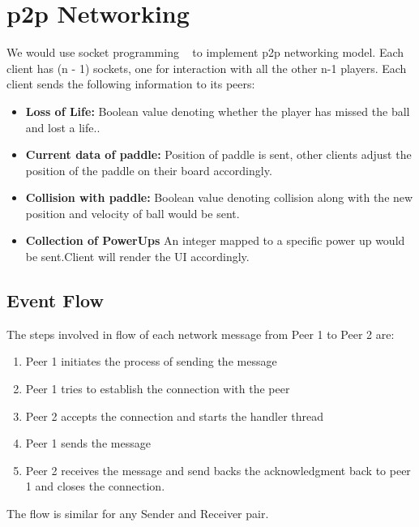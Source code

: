 \documentclass{article}
\begin{document}
			\section{p2p Networking}
			\par\noindent We would use socket programming ~\cite{socket_java} to implement p2p networking model. Each client has (n - 1) sockets, one for interaction with all the other n-1 players. Each client sends the following information to its peers:
			\begin{itemize}
			\item \textbf{Loss of Life:} Boolean value denoting whether the player has missed the ball and lost a life..
			\item \textbf{Current data of paddle:} Position of paddle is sent,  other clients adjust the position of the paddle on their board accordingly. 
			\item \textbf{Collision with paddle:} Boolean value denoting collision along with the new position and velocity of ball would be sent.
			\item \textbf{Collection of PowerUps} An integer mapped to a specific power up would be sent.Client will render the UI accordingly.
			\end{itemize}
			\subsection{Event Flow}
			The steps involved in flow of each network message from Peer 1 to Peer 2 are:
			\begin{enumerate}
			\item Peer 1 initiates the process of sending the message
			\item Peer 1 tries to establish the connection with the peer
			\item Peer 2 accepts the connection and starts the handler thread
			\item Peer 1 sends the message
			\item Peer 2 receives the message and send backs the acknowledgment back to peer 1 and closes the connection.
			\end{enumerate}
			The flow is similar for any Sender and Receiver pair.
\end{document}
